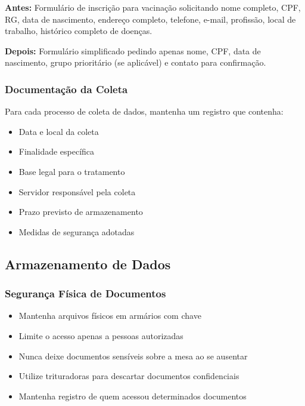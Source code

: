 \documentclass[12pt,a4paper]{article}
\begin{document}
\begin{tcolorbox}[colback=verdeclaro, colframe=green!75!black, title=Exemplo Prático]
\textbf{Antes:} Formulário de inscrição para vacinação solicitando nome completo, CPF, RG, data de nascimento, endereço completo, telefone, e-mail, profissão, local de trabalho, histórico completo de doenças.

\textbf{Depois:} Formulário simplificado pedindo apenas nome, CPF, data de nascimento, grupo prioritário (se aplicável) e contato para confirmação.
\end{tcolorbox}

\subsubsection{Documentação da Coleta}
Para cada processo de coleta de dados, mantenha um registro que contenha:
\begin{itemize}
    \item Data e local da coleta
    \item Finalidade específica
    \item Base legal para o tratamento
    \item Servidor responsável pela coleta
    \item Prazo previsto de armazenamento
    \item Medidas de segurança adotadas
\end{itemize}

\subsection{Armazenamento de Dados}

\subsubsection{Segurança Física de Documentos}
\begin{itemize}
    \item Mantenha arquivos físicos em armários com chave
    \item Limite o acesso apenas a pessoas autorizadas
    \item Nunca deixe documentos sensíveis sobre a mesa ao se ausentar
    \item Utilize trituradoras para descartar documentos confidenciais
    \item Mantenha registro de quem acessou determinados documentos
\end{itemize}
\end{document}
